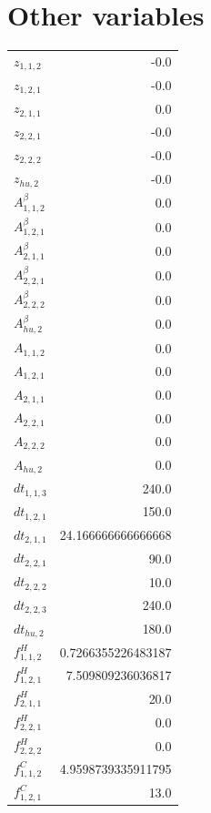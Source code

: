 \documentclass{article}%
\makeatletter
\let\mcnewpage=\newpage%
\newcommand{\TrickSupertabularIntoMulticols}{%
\renewcommand\newpage{%
\if@firstcolumn%
\hrule width\linewidth height0pt%
\columnbreak%
\else%
\mcnewpage%
\fi%
}%
}%
\makeatother
\begin{document}
\section{Other variables}%
\thispagestyle{plain}%
\begin{multicols*}{3}%
\TrickSupertabularIntoMulticols%
%
\begin{supertabular}{lr}%
	$z_{1,1,2}$ & -0.0 \\%
	$z_{1,2,1}$ & -0.0 \\%
	$z_{2,1,1}$ & 0.0 \\%
	$z_{2,2,1}$ & -0.0 \\%
	$z_{2,2,2}$ & -0.0 \\%
	$z_{hu,2}$ & -0.0 \\%
	$A_{1,1,2}^{\beta}$ & 0.0 \\%
	$A_{1,2,1}^{\beta}$ & 0.0 \\%
	$A_{2,1,1}^{\beta}$ & 0.0 \\%
	$A_{2,2,1}^{\beta}$ & 0.0 \\%
	$A_{2,2,2}^{\beta}$ & 0.0 \\%
	$A_{hu,2}^{\beta}$ & 0.0 \\%
	$A_{1,1,2}$ & 0.0 \\%
	$A_{1,2,1}$ & 0.0 \\%
	$A_{2,1,1}$ & 0.0 \\%
	$A_{2,2,1}$ & 0.0 \\%
	$A_{2,2,2}$ & 0.0 \\%
	$A_{hu,2}$ & 0.0 \\%
	$dt_{1,1,3}$ & 240.0 \\%
	$dt_{1,2,1}$ & 150.0 \\%
	$dt_{2,1,1}$ & 24.166666666666668 \\%
	$dt_{2,2,1}$ & 90.0 \\%
	$dt_{2,2,2}$ & 10.0 \\%
	$dt_{2,2,3}$ & 240.0 \\%
	$dt_{hu,2}$ & 180.0 \\%
	$f_{1,1,2}^{H}$ & 0.7266355226483187 \\%
	$f_{1,2,1}^{H}$ & 7.509809236036817 \\%
	$f_{2,1,1}^{H}$ & 20.0 \\%
	$f_{2,2,1}^{H}$ & 0.0 \\%
	$f_{2,2,2}^{H}$ & 0.0 \\%
	$f_{1,1,2}^{C}$ & 4.9598739335911795 \\%
	$f_{1,2,1}^{C}$ & 13.0 \\%

\end{supertabular}
\end{multicols*}
\end{document}
